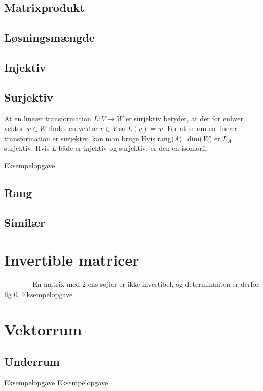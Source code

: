 \documentclass[a4paper,oneside,article]{memoir}
\begin{document}
\section{Matrixprodukt}

\section{Løsningsmængde}

\section{Injektiv}
\section{Surjektiv} \label{sc:sur}
At en lineær transformation $L: V \rightarrow W$ er surjektiv betyder, at der for enhver vektor $w \in W$ findes en vektor $v\in V$ så $L(v)=w$. For at se om en lineær transformation er surjektiv, kan man bruge 
Hvis rang(\emph{A})=dim(\emph{W}) er $L_A$ surjektiv. Hvis \emph{L} både er injektiv og surjektiv, er den en isomorfi. 

\hyperref[asc:Eksamen 2020 opg 1]{Eksempelopgave}

\section{Rang} \label{sc:rang}

\section{Similær}

\chapter{Invertible matricer} \label{ch:inv}
\textcolor{white}{singulær}
En matrix med 2 ens søjler er ikke invertibel, og determinanten er derfor lig 0. 
\hyperref[asc:Eksamen 2020 opg 3]{Eksempelopgave}

\chapter{Vektorrum} \label{ch:rum}
\section{Underrum} \label{sc:urum}
\hyperref[asc:Reeksamen 2022 opg 1]{Eksempelopgave}
\hyperref[asc:Eksamen 2021 opg 1]{Eksempelopgave}
\end{document}
